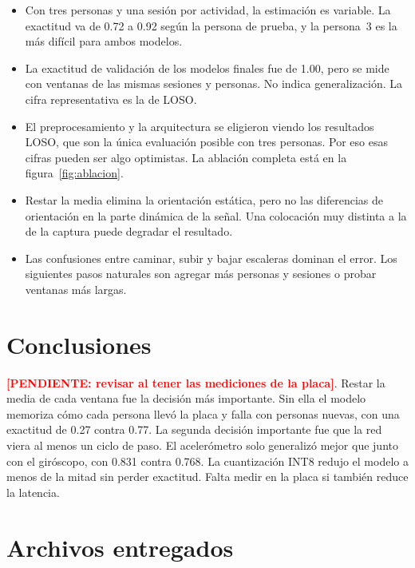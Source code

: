 \documentclass[11pt,a4paper]{article}
\newcommand{\pendiente}[1]{\textcolor{red}{\textbf{[PENDIENTE: #1]}}}
\begin{document}
\begin{itemize}
\item Con tres personas y una sesión por actividad, la estimación es variable. La exactitud va de 0.72 a 0.92 según la persona de prueba, y la persona~3 es la más difícil para ambos modelos.
\item La exactitud de validación de los modelos finales fue de 1.00, pero se mide con ventanas de las mismas sesiones y personas. No indica generalización. La cifra representativa es la de LOSO.
\item El preprocesamiento y la arquitectura se eligieron viendo los resultados LOSO, que son la única evaluación posible con tres personas. Por eso esas cifras pueden ser algo optimistas. La ablación completa está en la figura~\ref{fig:ablacion}.
\item Restar la media elimina la orientación estática, pero no las diferencias de orientación en la parte dinámica de la señal. Una colocación muy distinta a la de la captura puede degradar el resultado.
\item Las confusiones entre caminar, subir y bajar escaleras dominan el error. Los siguientes pasos naturales son agregar más personas y sesiones o probar ventanas más largas.
\end{itemize}

\section{Conclusiones}

\pendiente{revisar al tener las mediciones de la placa}. Restar la media de cada ventana fue la decisión más importante. Sin ella el modelo memoriza cómo cada persona llevó la placa y falla con personas nuevas, con una exactitud de 0.27 contra 0.77. La segunda decisión importante fue que la red viera al menos un ciclo de paso. El acelerómetro solo generalizó mejor que junto con el giróscopo, con 0.831 contra 0.768. La cuantización INT8 redujo el modelo a menos de la mitad sin perder exactitud. Falta medir en la placa si también reduce la latencia.

\section{Archivos entregados}
\end{document}
